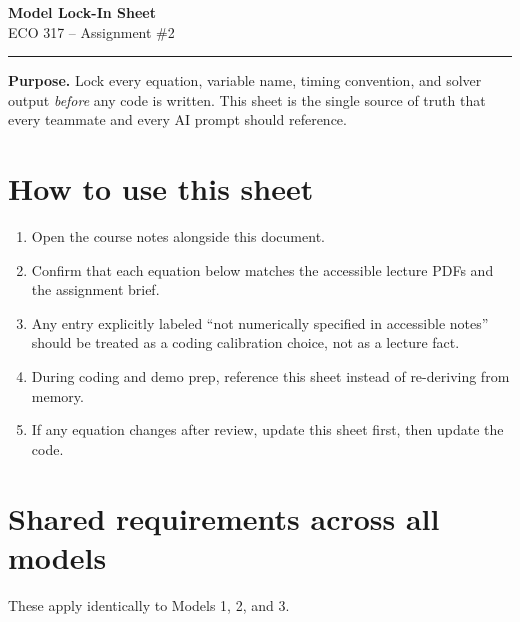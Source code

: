 \documentclass[11pt]{article}
\begin{document}
\begin{center}
    {\LARGE \textbf{Model Lock-In Sheet}}\\[0.4em]
    {\large ECO 317 -- Assignment \#2}\\[0.4em]
    \rule{0.9\linewidth}{0.5pt}
\end{center}

\begin{goalbox}
\textbf{Purpose.} Lock every equation, variable name, timing convention, and solver output \emph{before} any code is written. This sheet is the single source of truth that every teammate and every AI prompt should reference.
\end{goalbox}

\section{How to use this sheet}

\begin{enumerate}
    \item Open the course notes alongside this document.
    \item Confirm that each equation below matches the accessible lecture PDFs and the assignment brief.
    \item Any entry explicitly labeled ``not numerically specified in accessible notes'' should be treated as a coding calibration choice, not as a lecture fact.
    \item During coding and demo prep, reference this sheet instead of re-deriving from memory.
    \item If any equation changes after review, update this sheet first, then update the code.
\end{enumerate}

\section{Shared requirements across all models}

These apply identically to Models 1, 2, and 3.
\end{document}

